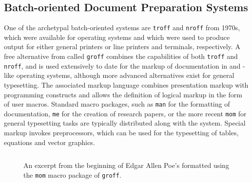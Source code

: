 \documentclass{book}
\begin{document}
      \subsection{Batch-oriented Document Preparation Systems}
        One of the archetypal batch-oriented systems are \texttt{troff} and
        \texttt{nroff} from 1970s, which were available for 
        operating systems and which were used to produce output for either
        general printers or line printers and terminals, respectively. A free
        alternative from  called \texttt{groff} combines the
        capabilities of both \texttt{troff} and \texttt{nroff}, and is used
        extensively to date for the markup of documentation in 
        and -like operating systems, although more advanced
        alternatives exist for general typesetting. The associated markup
        language combines presentation markup with programming constructs and
        allows the definition of logical markup in the form of user macros.
        Standard macro packages, such as \texttt{man} for the formatting of
        documentation, \texttt{me} for the creation of research papers, or
        the more recent \texttt{mom} for general typesetting tasks are
        typically distributed along with the system. Special markup invokes
        preprocessors, which can be used for the typesetting of tables,
        equations and vector graphics.

        \begin{figure}
          \inputminted{groff}{examples/02/poe.groff}
          \caption{An excerpt from the beginning of Edgar Allen Poe's
             formatted using the \texttt{mom}
            macro package of \texttt{groff}.}
          \label{fig:poe}
        \end{figure}

\end{document}
